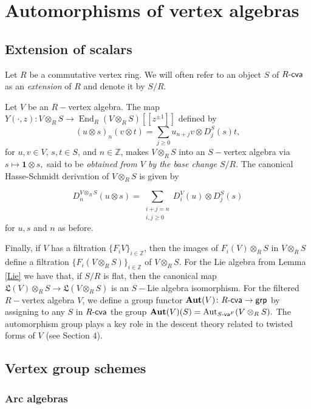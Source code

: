 \documentclass{article}
\theoremstyle{definition}
\def\End{\ensuremath{\operatorname{End}}}
\def\Aut{\ensuremath{\operatorname{Aut}}}
\def\BAut{\ensuremath{\operatorname{\mathbf{Aut}}}}
\def\Rcva{\ensuremath{R\text{-\textup{\textsf{cva}}}}}
\def\Sfva{\ensuremath{S\text{-\textup{\textsf{va}}}}^F}
\def\grp{\ensuremath{\text{\textup{\textsf{grp}}}}}
\begin{document}
\section{Automorphisms of vertex algebras}

\subsection{Extension of scalars}\label{ES}

    Let $R$ be a commutative vertex ring. 
     We will often refer to an object $S$ of $\Rcva$ as an \emph{extension} of $R$ and denote it by $S/R.$ 
     
     Let $V$ be an $R-$vertex algebra. The map $Y(\cdot, z) \colon V \otimes_R S \to \End_R (V \otimes_R S) [[z^{\pm 1}]]$ defined by 
     \[ (u \otimes s)_n (v \otimes t) = \sum_{j \geq 0} u_{n+j} v \otimes D^S_j( s)t, \]
     for $u,v \in V$, $s,t \in S$, and $n \in \mathbb Z$, makes $V \otimes_R S$ into an $S-$vertex algebra via $s \mapsto \mathbf 1 \otimes s,$  said to be {\it obtained from $V$ by the base change $S/R.$}    
The canonical Hasse-Schmidt derivation of $V \otimes_R S$ is given by
    
     \[ D^{V \otimes_R S}_n(u \otimes s)  = \sum_{\substack{i+j = n \\ i, j \geq 0}} D^V_i(u) \otimes D^S_j(s)\]
     for $u,s$ and $n$ as before.
     
Finally, if $V$ has a filtration $\{F_i V\}_{i \in \mathbb Z}$, then the images of $F_i(V) \otimes_R S$ in $V \otimes_R S$ define a filtration $\{F_i (V \otimes_R S)\}_{i \in \mathbb Z}$ of $V \otimes_R S.$
For the Lie algebra from Lemma \ref{Lie} we have that, if $S/R$ is flat, then the canonical map $\mathfrak L(V) \otimes_R S \to \mathfrak L(V \otimes_R S)$ is an $S-$Lie algebra isomorphism.
For the filtered $R-$vertex algebra $V$, we define a group functor $\BAut(V) \colon \Rcva \to \grp$ by assigning to any $S$ in $\Rcva$ the group $\BAut(V)(S) = \Aut_{\Sfva}(V \otimes_R S).$
 The automorphism group plays a key role in the descent theory related to twisted forms of $V$ (see Section 4).

\subsection{Vertex group schemes}

\subsubsection{Arc algebras}
\end{document}
